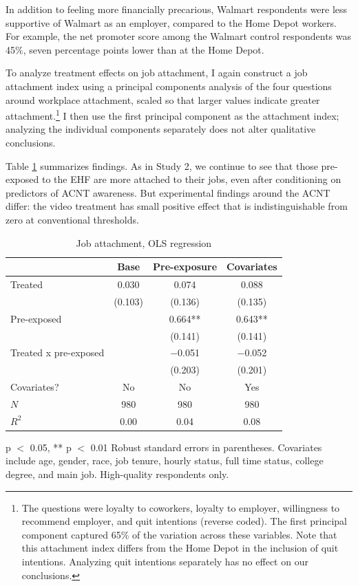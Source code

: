 \documentclass[
  11pt,
  oneside]{article}
\begin{document}
In addition to feeling more financially precarious, Walmart respondents were less supportive of Walmart as an employer, compared to the Home Depot workers. For example, the net promoter score among the Walmart control respondents was 45\%, seven percentage points lower than at the Home Depot.

To analyze treatment effects on job attachment, I again construct a job attachment index using a principal components analysis of the four questions around workplace attachment, scaled so that larger values indicate greater attachment.\footnote{The questions were loyalty to coworkers, loyalty to employer, willingness to recommend employer, and quit intentions (reverse coded). The first principal component captured 65\% of the variation across these variables. Note that this attachment index differs from the Home Depot in the inclusion of quit intentions. Analyzing quit intentions separately has no effect on our conclusions.} I then use the first principal component as the attachment index; analyzing the individual components separately does not alter qualitative conclusions.

Table \ref{tab:tab-attachment-models-wmt} summarizes findings. As in Study 2, we continue to see that those pre-exposed to the EHF are more attached to their jobs, even after conditioning on predictors of ACNT awareness. But experimental findings around the ACNT differ: the video treatment has small positive effect that is indistinguishable from zero at conventional thresholds.

\begin{table}
\centering
\caption{\label{tab:tab-attachment-models-wmt}Job attachment, OLS regression \label{tab:tab-attachment-models-wmt}}
\centering
\begin{threeparttable}
\begin{tabular}[t]{lccc}
\toprule
  & Base & Pre-exposure & Covariates\\
\midrule
Treated & \num{0.030} & \num{0.074} & \num{0.088}\\
 & (\num{0.103}) & (\num{0.136}) & (\num{0.135})\\
Pre-exposed &  & \num{0.664}** & \num{0.643}**\\
 &  & (\num{0.141}) & (\num{0.141})\\
Treated x pre-exposed &  & \num{-0.051} & \num{-0.052}\\
 &  & (\num{0.203}) & (\num{0.201})\\
\midrule
Covariates? & No & No & Yes\\
$N$ & \num{980} & \num{980} & \num{980}\\
$R^2$ & \num{0.00} & \num{0.04} & \num{0.08}\\
\bottomrule
\end{tabular}
\begin{tablenotes}
\item * p $<$ 0.05, ** p $<$ 0.01 Robust standard errors in parentheses. Covariates include age, gender, race, job tenure, hourly status, full time status, college degree, and main job.  High-quality respondents only.
\end{tablenotes}
\end{threeparttable}
\end{table}
\end{document}
